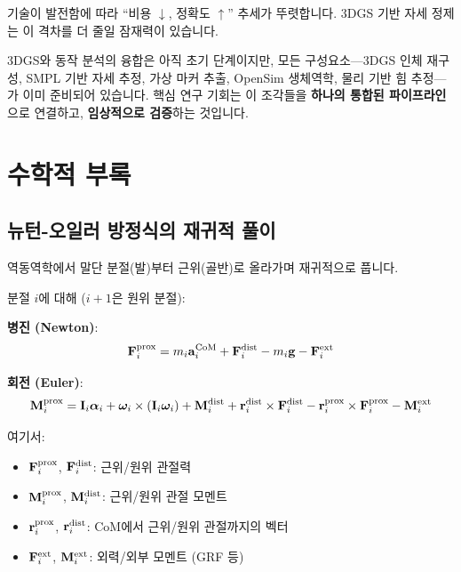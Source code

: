 \documentclass[11pt, a4paper]{report}
\begin{document}
기술이 발전함에 따라 ``비용 $\downarrow$, 정확도 $\uparrow$'' 추세가 뚜렷합니다. 3DGS 기반 자세 정제는 이 격차를 더 줄일 잠재력이 있습니다.

\begin{summary}
3DGS와 동작 분석의 융합은 아직 초기 단계이지만, 모든 구성요소---3DGS 인체 재구성, SMPL 기반 자세 추정, 가상 마커 추출, OpenSim 생체역학, 물리 기반 힘 추정---가 이미 준비되어 있습니다. 핵심 연구 기회는 이 조각들을 \textbf{하나의 통합된 파이프라인}으로 연결하고, \textbf{임상적으로 검증}하는 것입니다.
\end{summary}


\chapter{수학적 부록}
\label{ch:appendix}

\section{뉴턴-오일러 방정식의 재귀적 풀이}
\label{sec:newton_euler_recursive}

역동역학에서 말단 분절(발)부터 근위(골반)로 올라가며 재귀적으로 풉니다.

분절 $i$에 대해 ($i+1$은 원위 분절):

\textbf{병진 (Newton)}:
\begin{equation}
\mathbf{F}_i^{\text{prox}} = m_i \mathbf{a}_i^{\text{CoM}} + \mathbf{F}_i^{\text{dist}} - m_i \mathbf{g} - \mathbf{F}_i^{\text{ext}}
\end{equation}

\textbf{회전 (Euler)}:
\begin{equation}
\mathbf{M}_i^{\text{prox}} = \mathbf{I}_i \bm{\alpha}_i + \bm{\omega}_i \times (\mathbf{I}_i \bm{\omega}_i) + \mathbf{M}_i^{\text{dist}} + \mathbf{r}_i^{\text{dist}} \times \mathbf{F}_i^{\text{dist}} - \mathbf{r}_i^{\text{prox}} \times \mathbf{F}_i^{\text{prox}} - \mathbf{M}_i^{\text{ext}}
\end{equation}

여기서:
\begin{itemize}[leftmargin=*]
  \item $\mathbf{F}_i^{\text{prox}}$, $\mathbf{F}_i^{\text{dist}}$: 근위/원위 관절력
  \item $\mathbf{M}_i^{\text{prox}}$, $\mathbf{M}_i^{\text{dist}}$: 근위/원위 관절 모멘트
  \item $\mathbf{r}_i^{\text{prox}}$, $\mathbf{r}_i^{\text{dist}}$: CoM에서 근위/원위 관절까지의 벡터
  \item $\mathbf{F}_i^{\text{ext}}$, $\mathbf{M}_i^{\text{ext}}$: 외력/외부 모멘트 (GRF 등)
\end{itemize}
\end{document}
